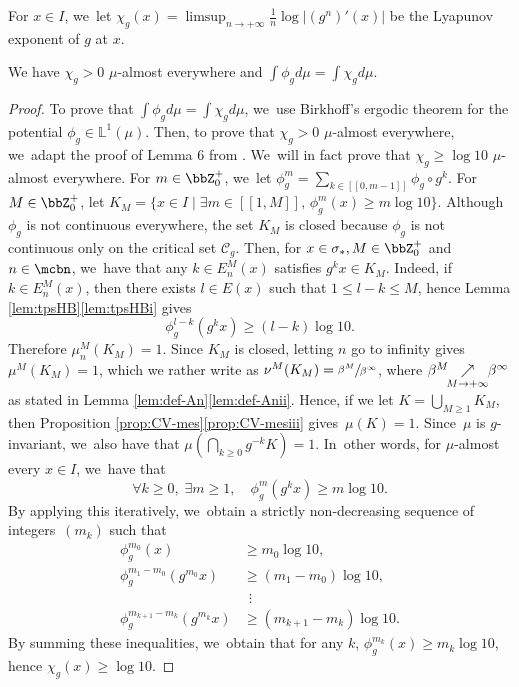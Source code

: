 For $x \in I$, we~let $\chi_g(x) = \limsup_{n \to +\infty} \frac{1}{n} \log |(g^n)'(x)|$ be the Lyapunov exponent of $g$ at $x$.

\begin{prop}
\label{prop:expo-pos}
We have $\chi_g > 0$ $\mu$-almost everywhere and $\int \phi_g d \mu = \int \chi_g d \mu$.
\end{prop}

\begin{proof}
To prove that $\int \phi_g d \mu = \int \chi_g d \mu$, we~use Birkhoff's ergodic theorem for the potential $\phi_g \in \mathbb{L}^1(\mu)$.
Then, to prove that $\chi_g > 0$ $\mu$-almost everywhere, we~adapt the proof of Lemma 6 from \cite{MR4703423}. We~will in fact prove that $\chi_g \geq \log 10$ $\mu$-almost everywhere.
For $m \in \bbZ_0^+$, we~let $\phi_g^m = \sum_{k \in [\![ 0, m-1 ]\!]} \phi_g \circ g^k$.
For $M \in \bbZ_0^+$, let $K_M = \{ x \in I \mid \exists m \in [\![ 1, M ]\!],\, \phi_g^m(x) \geq m \log 10 \}$.
Although $\phi_g$ is not continuous everywhere, the set $K_M$ is closed because $\phi_g$ is not continuous only on the critical set $\mathcal{C}_g$.
Then, for $x \in \sigma_*, M \in \bbZ_0^+$ and $n \in \mcbn$, we~have that any $k \in E_n^M(x)$ satisfies $g^k x \in K_M$.
Indeed, if $k \in E_n^M(x)$, then there exists $l \in E(x)$ such that $1 \leq l-k \leq M$, hence Lemma \ref{lem:tpsHB}\eqref{lem:tpsHBi} gives
\[
\phi_g^{l-k}(g^k x) \geq (l-k) \log 10.
\]
Therefore $\mu_n^M(K_M) \!=\! 1$. Since $K_M$ is closed, letting $n$ go to infinity gives \hbox{$\mu^M(K_M) \!=\! 1$}, which we rather write as $\nu^M(K_M) = \sfrac{\beta^M}{\beta^{\infty}}$, where $\beta^M \mkern-8mu\underset{M \to +\infty}{\nearrow}\mkern-6mu\beta^{\infty}$ as stated in Lemma \ref{lem:def-An}\eqref{lem:def-Anii}.
Hence, if we let $K \!=\! \bigcup_{M \geq 1} K_M$, then Proposition \ref{prop:CV-mes}\eqref{prop:CV-mesiii} gives~\hbox{$\mu(K) \!=\! 1$}.
Since~$\mu$ is $g$-invariant, we~also have that $\mu (\bigcap_{k \geq 0} g^{-k} K) = 1$. In~other words, for $\mu$-almost every $x \in I$, we~have that
\[
\forall k \geq 0,\; \exists m \geq 1,\quad \phi_g^m(g^k x) \geq m \log 10.
\]
By applying this iteratively, we~obtain a strictly non-decreasing sequence of integers~$(m_k)$ such that
\begin{align*}
\phi_g^{m_0}(x) &\geq m_0 \log 10,\\
\phi_g^{m_1 - m_0}(g^{m_0} x) &\geq (m_1 - m_0) \log 10,\\[-5pt]
&\;\,\vdots\\[-5pt]
\phi_g^{m_{k+1} - m_k}(g^{m_k} x) &\geq (m_{k+1} - m_k) \log 10.
\end{align*}
By summing these inequalities, we~obtain that for any $k$, $\phi_g^{m_k}(x) \geq m_k \log 10$, hence $\chi_g(x) \geq \log 10$.
\end{proof}

